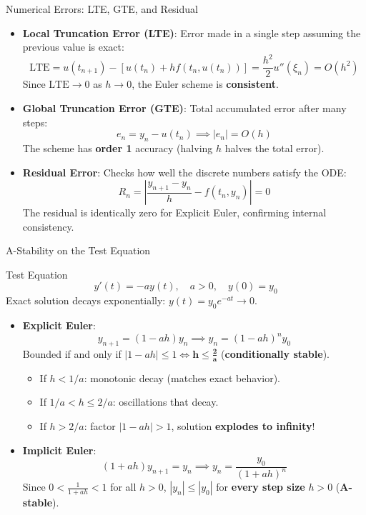 \documentclass[aspectratio=169,10pt]{beamer}
\begin{document}
\begin{frame}{Numerical Errors: LTE, GTE, and Residual}
  \begin{itemize}
    \item \textbf{Local Truncation Error (LTE)}: Error made in a single step assuming the previous value is exact:
    \[
      \text{LTE} = u(t_{n+1}) - \left[ u(t_n) + h f(t_n, u(t_n)) \right] = \frac{h^2}{2} u''(\xi_n) = O(h^2)
    \]
    Since $\text{LTE} \to 0$ as $h \to 0$, the Euler scheme is \textbf{consistent}.

    \item \textbf{Global Truncation Error (GTE)}: Total accumulated error after many steps:
    \[
      e_n = y_n - u(t_n) \implies |e_n| = O(h)
    \]
    The scheme has \textbf{order 1} accuracy (halving $h$ halves the total error).

    \item \textbf{Residual Error}: Checks how well the discrete numbers satisfy the ODE:
    \[
      R_n = \left| \frac{y_{n+1} - y_n}{h} - f(t_n, y_n) \right| = 0
    \]
    The residual is identically zero for Explicit Euler, confirming internal consistency.
  \end{itemize}
\end{frame}

\begin{frame}{A-Stability on the Test Equation}
  \begin{block}{Test Equation}
    \[
      y'(t) = -a y(t), \quad a > 0, \quad y(0) = y_0
    \]
    Exact solution decays exponentially: $y(t) = y_0 e^{-at} \to 0$.
  \end{block}

  \begin{itemize}
    \item \textbf{Explicit Euler}:
    \[
      y_{n+1} = (1 - ah) y_n \implies y_n = (1 - ah)^n y_0
    \]
    Bounded if and only if $|1 - ah| \le 1 \iff \mathbf{h \le \frac{2}{a}}$ (\textbf{conditionally stable}).
    \begin{itemize}
      \item If $h < 1/a$: monotonic decay (matches exact behavior).
      \item If $1/a < h \le 2/a$: oscillations that decay.
      \item If $h > 2/a$: factor $|1-ah| > 1$, solution \textbf{explodes to infinity}!
    \end{itemize}

    \item \textbf{Implicit Euler}:
    \[
      (1 + ah) y_{n+1} = y_n \implies y_n = \frac{y_0}{(1 + ah)^n}
    \]
    Since $0 < \frac{1}{1 + ah} < 1$ for all $h > 0$, $|y_n| \le |y_0|$ for \textbf{every step size} $h > 0$ (\textbf{A-stable}).
  \end{itemize}
\end{frame}
\end{document}
